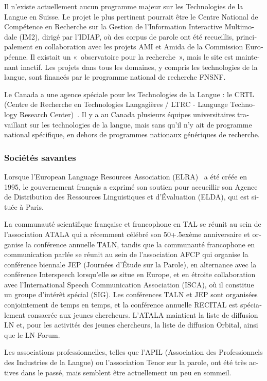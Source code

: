 \begin{french}
\begin{multicols}{2}
Il n'existe actuellement aucun programme majeur sur les Technologies
de la Langue en Suisse. Le projet le plus pertinent pourrait être le
Centre National de Compétence en Recherche sur la Gestion de
l'Information Interactive Multimodale (IM2), dirigé par l'IDIAP, où
des corpus de parole ont été recueillis, principalement en
collaboration avec les projets AMI et Amida de la Commission Européenne. Il existait un
«~observatoire pour la recherche~», mais le site est maintenant
inactif. Les projets dans tous les domaines, y compris les
technologies de la langue, sont financés par le programme national de
recherche FNSNF.

Le Canada a une agence spéciale pour les Technologies de la Langue :
le CRTL (Centre de Recherche en Technologies Langagières / LTRC -
Language Technology Research Center)~\cite{canadacrtl}. Il y a au
Canada plusieurs équipes universitaires travaillant sur les
technologies de la langue, mais sans qu'il n'y ait de
programme national spécifique, en dehors de programmes nationaux
génériques de recherche.

\subsubsection{Sociétés savantes}

Lorsque l'European Language Resources Association (ELRA)~\cite{elra} a été créée
en 1995, le gouvernement français a exprimé son soutien pour
accueillir son Agence de Distribution des Ressources Linguistiques et
d'Évaluation (ELDA), qui est située à Paris.

La communauté scientifique française et francophone en TAL se réunit
au sein de l'association ATALA qui a récemment célébré son
50\raise+.5ex\hbox{ème} anniversaire et organise la conférence
annuelle TALN, tandis que la communauté francophone en communication
parlée se réunit au sein de l'association AFCP qui organise la
conférence biennale JEP (Journées d'Étude sur la Parole), en
alternance avec la conférence Interspeech lorsqu'elle se situe en
Europe, et en étroite collaboration avec l'International Speech
Communication Association (ISCA), où il constitue un groupe d'intérêt
spécial (SIG). Les conférences TALN et JEP sont organisées
conjointement de temps en temps, et la conférence annuelle RECITAL est
spécialement consacrée aux jeunes chercheurs. L'ATALA maintient la
liste de diffusion LN et, pour les activités des jeunes chercheurs, la
liste de diffusion Orbital, ainsi que le LN-Forum.

Les associations professionnelles, telles que l'APIL (Association des
Professionnels des Industries de la Langue) ou l'association Tenor sur
la parole, ont été très actives dans le passé, mais semblent être
actuellement un peu en sommeil.


\end{multicols}
\end{french}
